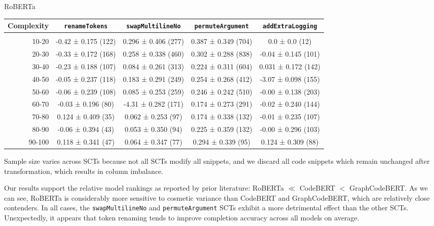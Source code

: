 \documentclass{article} %
\begin{document}
{  RoBERTa
  \begin{table}[H]
    \tiny
    \begin{tabular}{r|cccc}
      Complexity          & \lstinline|renameTokens|        & \lstinline|swapMultilineNo|     & \lstinline|permuteArgument|     & \lstinline|addExtraLogging|     \\\hline\\
      10-20               & -0.42 ± 0.175 (122) & 0.296 ± 0.406 (277) & 0.387 ± 0.349 (704) & 0.0 ± 0.0     (12)  \\
      20-30               & -0.33 ± 0.172 (168) & 0.258 ± 0.338 (460) & 0.302 ± 0.288 (838) & -0.04 ± 0.145 (101) \\
      30-40               & -0.23 ± 0.188 (107) & 0.084 ± 0.261 (313) & 0.224 ± 0.311 (604) & 0.031 ± 0.172 (142) \\
      40-50               & -0.05 ± 0.237 (118) & 0.183 ± 0.291 (249) & 0.254 ± 0.268 (412) & -3.07 ± 0.098 (155) \\
      50-60               & -0.06 ± 0.239 (108) & 0.085 ± 0.253 (259) & 0.246 ± 0.242 (510) & -0.00 ± 0.138 (203) \\
      60-70               & -0.03 ± 0.196 (80)  & -4.31 ± 0.282 (171) & 0.174 ± 0.273 (291) & -0.02 ± 0.240 (144) \\
      70-80               & 0.124 ± 0.409 (35)  & 0.062 ± 0.253 (97)  & 0.174 ± 0.338 (132) & -0.01 ± 0.235 (107) \\
      80-90               & -0.06 ± 0.394 (43)  & 0.053 ± 0.350 (94)  & 0.225 ± 0.359 (132) & -0.00 ± 0.296 (103) \\
      90-100              & 0.118 ± 0.341 (47)  & 0.064 ± 0.347 (77)  & 0.294 ± 0.339 (95)  & 0.124 ± 0.309 (88)  \\
    \end{tabular}
  \end{table}
}

Sample size varies across SCTs because not all SCTs modify all snippets, and we discard all code snippets which remain unchanged after transformation, which results in column imbalance.

Our results support the relative model rankings as reported by prior literature: RoBERTa $\ll$ CodeBERT $<$ GraphCodeBERT. As we can see, RoBERTa is considerably more sensitive to cosmetic variance than CodeBERT and GraphCodeBERT, which are relatively close contenders. In all cases, the \lstinline|swapMultilineNo| and \lstinline|permuteArgument| SCTs exhibit a more detrimental effect than the other SCTs. Unexpectedly, it appears that token renaming tends to improve completion accuracy across all models on average.
\end{document}
